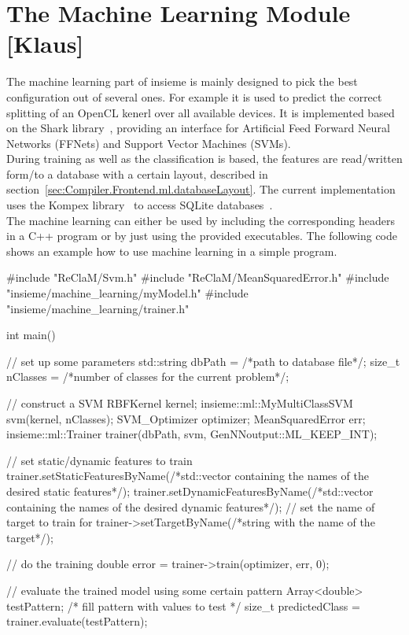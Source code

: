\section{The Machine Learning Module [Klaus]}

The machine learning part of insieme is mainly designed to pick the best configuration out of several ones. For example it is used to predict the correct splitting of an OpenCL kenerl over all available devices. It is implemented based on the Shark library~\cite{shark}, providing an interface for Artificial Feed Forward Neural Networks (FFNets) and Support Vector Machines (SVMs). \\

During training as well as the classification is based, the features are read/written form/to a database with a certain layout, described in section~\ref{sec:Compiler.Frontend.ml.databaseLayout}. The current implementation uses the Kompex library~\cite{kompex} to access SQLite databases~\cite{sqlite}. \\

The machine learning can either be used by including the corresponding headers in a C++ program or by just using the provided executables. The following code shows an example how to use machine learning in a simple program. \\

\begin{insCode}
#include "ReClaM/Svm.h"
#include "ReClaM/MeanSquaredError.h"
#include "insieme/machine_learning/myModel.h"
#include "insieme/machine_learning/trainer.h"


int main() {
	// set up some parameters
	std::string dbPath = /*path to database file*/;
	size_t nClasses = /*number of classes for the current problem*/;
	
	// construct a SVM
	RBFKernel kernel;
	insieme::ml::MyMultiClassSVM svm(kernel, nClasses); 
	SVM_Optimizer optimizer;
	MeanSquaredError err;
	insieme::ml::Trainer trainer(dbPath, svm, GenNNoutput::ML_KEEP_INT);
	
	// set static/dynamic features to train 
	trainer.setStaticFeaturesByName(/*std::vector containing the names of the desired static features*/);
	trainer.setDynamicFeaturesByName(/*std::vector containing the names of the desired dynamic features*/);
	// set the name of target to train for
	trainer->setTargetByName(/*string with the name of the target*/);
	
	// do the training
	double error = trainer->train(optimizer, err, 0);
	
	// evaluate the trained model using some certain pattern
	Array<double> testPattern;
	/* fill pattern with values to test */
	size_t predictedClass = trainer.evaluate(testPattern);
}
\end{insCode}

